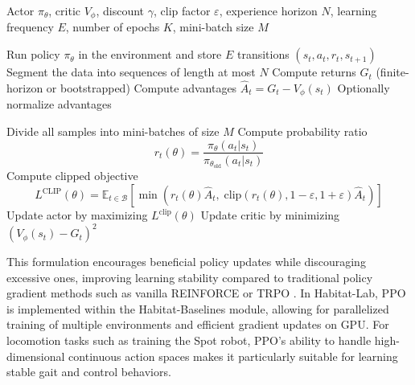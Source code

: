 \documentclass{article} %
\begin{document}
\begin{algorithm}[H]
\caption{Proximal Policy Optimization (PPO) Training Algorithm}
\label{alg:ppo}
\begin{algorithmic}[1]

\Require Actor $\pi_\theta$, critic $V_\phi$, discount $\gamma$, clip factor $\varepsilon$, 
experience horizon $N$, learning frequency $E$, number of epochs $K$, mini-batch size $M$

\Repeat
    \State Run policy $\pi_\theta$ in the environment and store $E$ transitions $(s_t,a_t,r_t,s_{t+1})$
    \State Segment the data into sequences of length at most $N$
        \State Compute returns $G_t$ (finite-horizon or bootstrapped)
        \State Compute advantages $\hat A_t = G_t - V_\phi(s_t)$
    \EndFor
    \State Optionally normalize advantages

        \State Divide all samples into mini-batches of size $M$
            \State Compute probability ratio
            \[
              r_t(\theta)=\frac{\pi_\theta(a_t|s_t)}{\pi_{\theta_\text{old}}(a_t|s_t)}
            \]
            \State Compute clipped objective
            \[
              L^{\text{CLIP}}(\theta) =
              \mathbb{E}_{t\in\mathcal{B}}
              \left[\min\!\left(
                r_t(\theta)\hat A_t,\;
                \mathrm{clip}(r_t(\theta),1-\varepsilon,1+\varepsilon)\hat A_t
              \right)\right]
            \]
            \State Update actor by maximizing $L^{\text{clip}}(\theta)$
            \State Update critic by minimizing $(V_\phi(s_t)-G_t)^2$
        \EndFor
    \EndFor
{}

\end{algorithmic}
\end{algorithm}


This formulation encourages beneficial policy updates while discouraging excessive ones, improving learning stability compared to traditional policy gradient methods such as vanilla REINFORCE \cite{zhang2021sample} or TRPO \cite{schulman2015trust}. In Habitat-Lab, PPO is implemented within the Habitat-Baselines module, allowing for parallelized training of multiple environments and efficient gradient updates on GPU. For locomotion tasks such as training the Spot robot, PPO’s ability to handle high-dimensional continuous action spaces makes it particularly suitable for learning stable gait and control behaviors.
\end{document}
